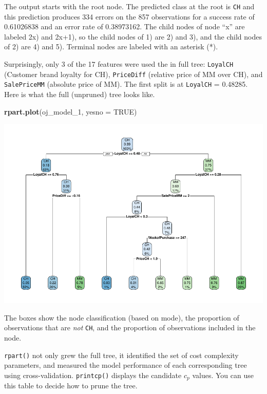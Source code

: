 \documentclass[
]{book}
\newenvironment{Shaded}{\begin{snugshade}}{\end{snugshade}}
\newcommand{\DataTypeTok}[1]{\textcolor[rgb]{0.13,0.29,0.53}{#1}}
\newcommand{\DecValTok}[1]{\textcolor[rgb]{0.00,0.00,0.81}{#1}}
\newcommand{\KeywordTok}[1]{\textcolor[rgb]{0.13,0.29,0.53}{\textbf{#1}}}
\newcommand{\NormalTok}[1]{#1}
\newcommand{\OtherTok}[1]{\textcolor[rgb]{0.56,0.35,0.01}{#1}}
\begin{document}
The output starts with the root node. The predicted class at the root is \texttt{CH} and this prediction produces 334 errors on the 857 observations for a success rate of 0.61026838 and an error rate of 0.38973162. The child nodes of node ``x'' are labeled 2x) and 2x+1), so the child nodes of 1) are 2) and 3), and the child nodes of 2) are 4) and 5). Terminal nodes are labeled with an asterisk (*).

Surprisingly, only 3 of the 17 features were used the in full tree: \texttt{LoyalCH} (Customer brand loyalty for CH), \texttt{PriceDiff} (relative price of MM over CH), and \texttt{SalePriceMM} (absolute price of MM). The first split is at \texttt{LoyalCH} = 0.48285. Here is what the full (unpruned) tree looks like.

\begin{Shaded}
\begin{Highlighting}[]
\KeywordTok{rpart.plot}\NormalTok{(oj_model_}\DecValTok{1}\NormalTok{, }\DataTypeTok{yesno =} \OtherTok{TRUE}\NormalTok{)}
\end{Highlighting}
\end{Shaded}

\includegraphics{data-sci_files/figure-latex/unnamed-chunk-51-1.pdf}

The boxes show the node classification (based on mode), the proportion of observations that are \emph{not} \texttt{CH}, and the proportion of observations included in the node.

\texttt{rpart()} not only grew the full tree, it identified the set of cost complexity parameters, and measured the model performance of each corresponding tree using cross-validation. \texttt{printcp()} displays the candidate \(c_p\) values. You can use this table to decide how to prune the tree.
\end{document}
